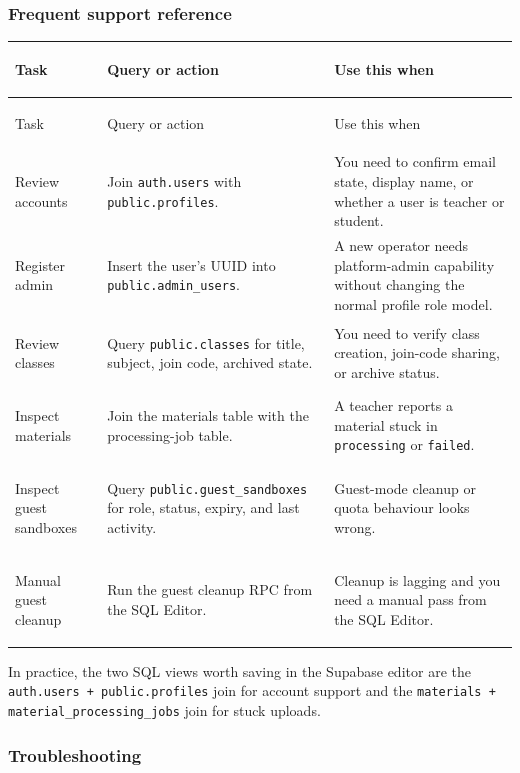\documentclass[11pt,a4paper]{article}
\begin{document}
\subsubsection*{Frequent support reference}

\begingroup
\small
\setlength\LTleft{0pt}
\setlength\LTright{0pt}
\begin{longtable}{@{}>{\bfseries\raggedright\arraybackslash}p{2.6cm}>{\raggedright\arraybackslash}p{5.1cm}>{\raggedright\arraybackslash}p{6.0cm}@{}}
\toprule
Task & Query or action & Use this when \\
\midrule
\endfirsthead
\toprule
Task & Query or action & Use this when \\
\midrule
\endhead
\bottomrule
\endfoot
\bottomrule
\endlastfoot
Review accounts & Join \texttt{auth.users} with \texttt{public.profiles}. & You need to confirm email state, display name, or whether a user is teacher or student. \\
Register admin & Insert the user's UUID into \texttt{public.admin\_users}. & A new operator needs platform-admin capability without changing the normal profile role model. \\
Review classes & Query \texttt{public.classes} for title, subject, join code, archived state. & You need to verify class creation, join-code sharing, or archive status. \\
Inspect materials & Join the materials table with the processing-job table. & A teacher reports a material stuck in \texttt{processing} or \texttt{failed}. \\
Inspect guest sandboxes & Query \texttt{public.guest\_sandboxes} for role, status, expiry, and last activity. & Guest-mode cleanup or quota behaviour looks wrong. \\
Manual guest cleanup & Run the guest cleanup RPC from the SQL Editor. & Cleanup is lagging and you need a manual pass from the SQL Editor. \\
\end{longtable}
\endgroup

\noindent In practice, the two SQL views worth saving in the Supabase editor are the
\texttt{auth.users + public.profiles} join for account support and the
\texttt{materials + material\_processing\_jobs} join for stuck uploads.

\subsubsection*{Troubleshooting}
\end{document}
